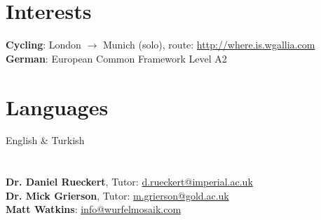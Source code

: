 \documentclass[margin,line,a4paper]{resume}
\begin{document}
\begin{resume}
\section{\mysidestyle Interests}

\textbf{Cycling}: London $\rightarrow$ Munich (solo), route: \href{http://where.is.wgallia.com}{http://where.is.wgallia.com} \vspace{1mm} \\
\textbf{German}: European Common Framework Level A2

\section{\mysidestyle Languages}

English \& Turkish

\section{}

\hypersetup{urlcolor=Fuchsia}
%
\textbf{Dr. Daniel Rueckert}, Tutor: \href{mailto:d.rueckert@imperial.ac.uk}{d.rueckert@imperial.ac.uk}
\vspace{2mm} \\
\textbf{Dr. Mick Grierson}, Tutor: \href{mailto:m.grierson@gold.ac.uk}{m.grierson@gold.ac.uk}
\vspace{2mm} \\
\textbf{Matt Watkins}: \href{info@wurfelmosaik.com}{info@wurfelmosaik.com}
\vspace{2mm} \\

\end{resume}
\end{document}
